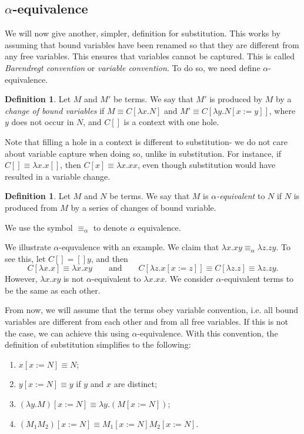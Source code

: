\documentclass[a4paper, openany]{memoir}
\theoremstyle{definition}
\newtheorem{definition}[proposition]{Definition}
\begin{document}
    \subsection{$\alpha$-equivalence}
    We will now give another, simpler, definition for substitution. This works by assuming that bound variables have been renamed so that they are different from any free variables. This ensures that variables cannot be captured. This is called \emph{Barendregt convention} or \emph{variable convention}. To do so, we need define $\alpha$-equivalence.
    \begin{definition}
        Let $M$ and $M'$ be terms. We say that $M'$ is produced by $M$ by a \emph{change of bound variables} if $M \equiv C[\lambda x.N]$ and $M' \equiv C[\lambda y.N[x := y]]$, where $y$ does not occur in $N$, and $C[]$ is a context with one hole.
    \end{definition}
    \noindent Note that filling a hole in a context is different to substitution- we do not care about variable capture when doing so, unlike in substitution. For instance, if $C[] \equiv \lambda x.x[]$, then $C[x] \equiv \lambda x.xx$, even though substitution would have resulted in a variable change.
    \begin{definition}
        Let $M$ and $N$ be terms. We say that $M$ is \emph{$\alpha$-equivalent} to $N$ if $N$ is produced from $M$ by a series of changes of bound variable.
    \end{definition}
    \noindent We use the symbol $\equiv_\alpha$ to denote $\alpha$ equivalence. 
    
    We illustrate $\alpha$-equvalence with an example. We claim that $\lambda x.xy \equiv_\alpha \lambda z.zy$. To see this, let $C[] = []y$, and then 
    \[C[\lambda x.x] \equiv \lambda x.xy \qquad \textrm{and} \qquad C[\lambda z.x[x := z]] \equiv C[\lambda z.z] \equiv \lambda z.zy.\] 
    However, $\lambda x.xy$ is not $\alpha$-equivalent to $\lambda x.xx$. We consider $\alpha$-equivalent terms to be the same as each other.

    From now, we will assume that the terms obey variable convention, i.e. all bound variables are different from each other and from all free variables. If this is not the case, we can achieve this using $\alpha$-equivalence. With this convention, the definition of substitution simplifies to the following:
    \begin{enumerate}
        \item $x[x := N] \equiv N$;
        \item $y[x := N] \equiv y$ if $y$ and $x$ are distinct;
        \item $(\lambda y.M)[x := N] \equiv \lambda y.(M[x := N])$;
        \item $(M_1 M_2)[x := N] \equiv M_1[x := N] M_2[x := N]$.
    \end{enumerate}
\end{document}
